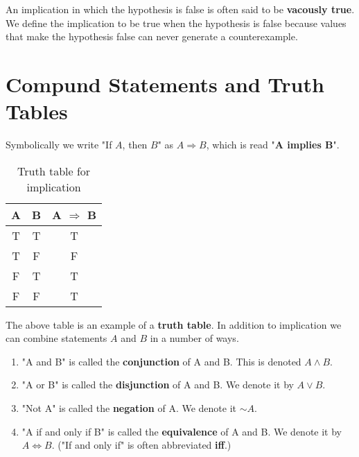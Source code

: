 \documentclass[a4paper, 11pt]{report}
\theoremstyle{plain}
\theoremstyle{definition}
\newcommand{\impl}{\Longrightarrow}
\newcommand{\eqvl}{\Longleftrightarrow}
\renewcommand{\neg}{{\sim}} %
\begin{document}
An implication in which the hypothesis is false is often said to be
\textbf{vacously true}. We define the implication to be
true when the hypothesis is false because values that make the hypothesis false
can never generate a counterexample.

\section{Compund Statements and Truth Tables}
\label{sec:compund_statements_and_truth_tables}

Symbolically we write "If $A$, then $B$" as $A \impl B$\index{$\impl$}, which is
read "\textbf{A implies B}". 

\begin{table}[h!]
  \centering
  \caption{Truth table for implication}
  \label{tab:implication}
  \begin{tabular}{ccc}
    \hline
    A & B & A $\impl$ B \\
    \hline
    T & T & T \\
    T & F & F \\
    F & T & T \\
    F & F & T \\
    \hline
  \end{tabular}
\end{table}

The above table is an example of a \textbf{truth table}.
In addition to implication we can combine statements $A$ and $B$ in a number of ways.
\begin{enumerate}
  \item "A and B" is called the \textbf{conjunction}\index{$\land$} of A and B. This is denoted $A \land B$.
  \item "A or B" is called the \textbf{disjunction}\index{$\lor$} of A and B. We denote it by $A \lor B$.
  \item "Not A" is called the \textbf{negation}\index{$\neg$} of A. We denote it $\neg A$.
  \item "A if and only if B" is called the
    \textbf{equivalence}\index{$\eqvl$} of A and B. We
    denote it by $A \eqvl B$. ("If and only if" is often abbreviated
    \textbf{iff}.)
\end{enumerate}
\end{document}
